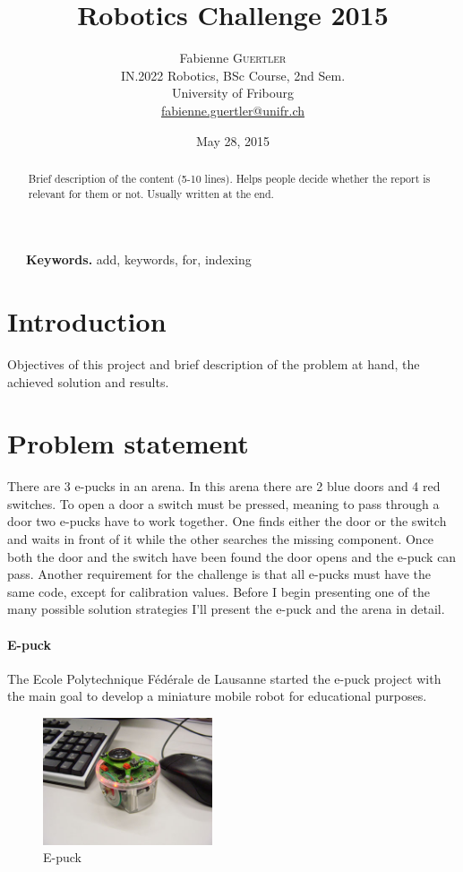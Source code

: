 \documentclass[12pt,a4paper]{article}
\title{Robotics Challenge 2015}
\date{May 28, 2015}
\author{
	Fabienne \textsc{Guertler}\\
	IN.2022 Robotics, BSc Course, 2nd Sem.\\
	University of Fribourg \\
	\href{mailto:fabienne.guertler@unifr.ch}{fabienne.guertler@unifr.ch}
}
\begin{document}
\maketitle

\begin{abstract}
\noindent Brief description of the content (5-10 lines). Helps people decide whether the report is relevant for them or not. Usually written at the end.
\end{abstract}
~~~\indent \textbf{Keywords.} add, keywords, for, indexing

\section*{Introduction}
Objectives of this project and brief description of the problem at hand, the achieved solution and results.

\section{Problem statement}
There are 3 e-pucks in an arena. In this arena there are 2 blue doors and 4 red switches. To open a door a switch must be pressed, meaning to pass through a door two e-pucks have to work together. One finds either the door or the switch and waits in front of it while the other searches the missing component. Once both the door and the switch have been found the door opens and the e-puck can pass. Another requirement for the challenge is that all e-pucks must have the same code, except for calibration values. Before I begin presenting one of the many possible solution strategies I'll present the e-puck and the arena in detail.

\paragraph{E-puck}
The Ecole Polytechnique Fédérale de Lausanne started the e-puck project with the main goal to develop a miniature mobile robot for educational purposes. 
\begin{figure}[h!]
\begin{center}
\includegraphics[width = 5cm]{images/epuck-look.jpg}
\caption{E-puck}
\label{fig:epuck}
\end{center}
\end{figure}
\end{document}
